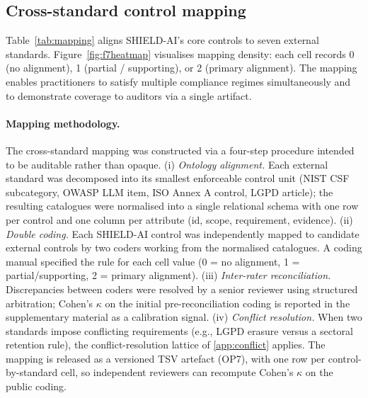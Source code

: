 \documentclass[preprint,12pt,authoryear]{elsarticle}
\begin{document}
\subsection{Cross-standard control mapping}
\label{ssec:mapping}
Table~\ref{tab:mapping} aligns SHIELD-AI's core controls to seven external standards. Figure~\ref{fig:f7heatmap} visualises mapping density: each cell records 0 (no alignment), 1 (partial / supporting), or 2 (primary alignment). The mapping enables practitioners to satisfy multiple compliance regimes simultaneously and to demonstrate coverage to auditors via a single artifact.

\paragraph{Mapping methodology.}
The cross-standard mapping was constructed via a four-step procedure intended to be auditable rather than opaque. (i) \emph{Ontology alignment.} Each external standard was decomposed into its smallest enforceable control unit (NIST CSF subcategory, OWASP LLM item, ISO Annex A control, LGPD article); the resulting catalogues were normalised into a single relational schema with one row per control and one column per attribute (id, scope, requirement, evidence). (ii) \emph{Double coding.} Each SHIELD-AI control was independently mapped to candidate external controls by two coders working from the normalised catalogues. A coding manual specified the rule for each cell value (0 = no alignment, 1 = partial/supporting, 2 = primary alignment). (iii) \emph{Inter-rater reconciliation.} Discrepancies between coders were resolved by a senior reviewer using structured arbitration; Cohen's $\kappa$ on the initial pre-reconciliation coding is reported in the supplementary material as a calibration signal. (iv) \emph{Conflict resolution.} When two standards impose conflicting requirements (e.g., LGPD erasure versus a sectoral retention rule), the conflict-resolution lattice of \ref{app:conflict} applies. The mapping is released as a versioned TSV artefact (OP7), with one row per control-by-standard cell, so independent reviewers can recompute Cohen's $\kappa$ on the public coding.
\end{document}
